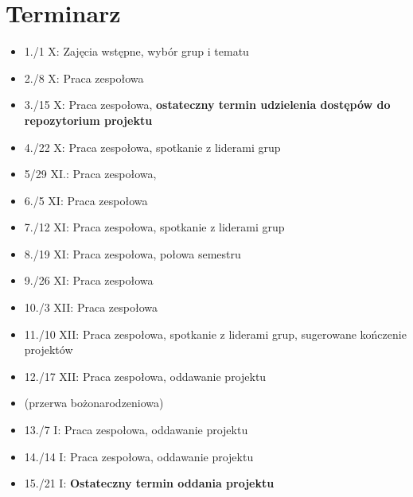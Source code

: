 \documentclass{article}
\begin{document}
	\section{Terminarz}
	\begin{itemize}
		\item 1./1 X: Zajęcia wstępne, wybór grup i tematu
		\item 2./8 X: Praca zespołowa
		\item 3./15 X: Praca zespołowa, \textbf{ostateczny termin udzielenia dostępów do repozytorium projektu}
		\item 4./22 X: Praca zespołowa, spotkanie z liderami grup
		\item 5/29 XI.: Praca zespołowa,
		\item 6./5 XI: Praca zespołowa
		\item 7./12 XI: Praca zespołowa, spotkanie z liderami grup
		\item 8./19 XI: Praca zespołowa, połowa semestru
		\item 9./26 XI: Praca zespołowa
		\item 10./3 XII: Praca zespołowa
		\item 11./10 XII: Praca zespołowa, spotkanie z liderami grup, sugerowane kończenie projektów
		\item 12./17 XII: Praca zespołowa, oddawanie projektu
		\item (przerwa bożonarodzeniowa)
		\item 13./7 I: Praca zespołowa, oddawanie projektu
		\item 14./14 I: Praca zespołowa, oddawanie projektu
		\item 15./21 I: \textbf{Ostateczny termin oddania projektu}
	\end{itemize}
\end{document}
